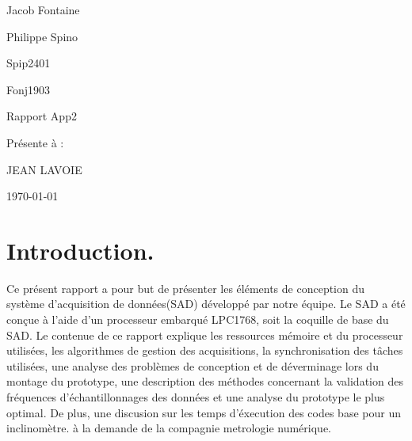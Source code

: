 \documentclass[12pt]{article}
\begin{document}
\begin{titlepage}
	\centering
	{\LARGE Jacob Fontaine \par
	 \LARGE Philippe Spino \par}
	\vspace{1cm}
	\small Spip2401\par
	\small Fonj1903\par 
	\vspace{3cm}
	{\Large Rapport App2\par}
	\vspace{5cm}
	{\Large Présente à :\par JEAN LAVOIE\par}
	\vspace{4cm}
	\vfill
	{\large \today\par}
\end{titlepage}

\newpage
\tableofcontents
\newpage
\onehalfspacing
\setlength{\parskip}{1em}
\section{Introduction.}
Ce présent rapport a pour but de présenter les éléments de conception du système d'acquisition de données(SAD) développé par notre équipe. Le SAD a été conçue à l'aide d'un processeur embarqué LPC1768, soit la coquille de base du SAD. Le contenue de ce rapport explique les ressources mémoire et du processeur utilisées, les algorithmes de gestion des acquisitions, la synchronisation des tâches utilisées, une analyse des problèmes de conception et de déverminage lors du montage du prototype, une description des méthodes concernant la validation des fréquences d'échantillonnages des données et une analyse du prototype le plus optimal. De plus, une discusion sur les temps d'éxecution des codes base pour un inclinomètre. à la demande de la compagnie metrologie numérique.
\end{document}
